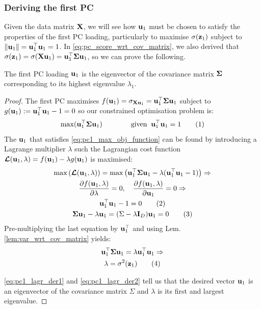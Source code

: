 \documentclass[a4paper]{article}
\begin{document}
\subsubsection{Deriving the first PC}

Given the data matrix $\textbf{X}$, we will see how $\textbf{u}_1$ must be chosen to satisfy the properties of the first PC loading, particularly to maximise $\sigma(\textbf{z}_1)$ subject to $\left\lVert\textbf{u}_1\right\rVert=\textbf{u}_1^{\top}\textbf{u}_1=1$. In \eqref{eq:pc_score_wrt_cov_matrix}, we also derived that $\sigma(\textbf{z}_1) = \sigma(\textbf{X}\textbf{u}_1) = \textbf{u}_1^{\top}\boldsymbol{\Sigma}\textbf{u}_1$, so we can prove the following.

\begin{corollary}[1st PC loading] 
The first PC loading $\textbf{u}_1$ is the eigenvector of the covariance matrix $\boldsymbol{\Sigma}$ corresponding to its highest eigenvalue $\lambda_1$.
\label{cor:first_loading_eigenvec}
\end{corollary}
\begin{proof}
The first PC maximises $f(\textbf{u}_1)=\sigma_{\textbf{X}\textbf{u}_1} = \textbf{u}_1^{\top}\boldsymbol{\Sigma}\textbf{u}_1$ subject to $g(\textbf{u}_1) := \textbf{u}_1^{\top}\textbf{u}_1 - 1 = 0$ so our constrained optimisation problem is:
\[
\max(\textbf{u}_1^{\top}\boldsymbol{\Sigma}\textbf{u}_1) \quad \quad \quad \quad \textup{given} \;\; \textbf{u}_1^{\top}\textbf{u}_1=1
\tag{1}
\label{eq:pc1_max_obj_function}
\]
The $\textbf{u}_1$ that satisfies \eqref{eq:pc1_max_obj_function} can be found by introducing a Lagrange multiplier $\lambda$ such the Lagrangian cost function $\boldsymbol{\mathcal{L}}(\textbf{u}_1,\lambda) = f(\textbf{u}_1) - \lambda g(\textbf{u}_1)$ is maximised:
\begin{gather*}
\max\left(\boldsymbol{\mathcal{L}}(\textbf{u}_1,\lambda)\right) = \max\left(\textbf{u}_1^{\top}\boldsymbol{\Sigma}\textbf{u}_1 - \lambda(\textbf{u}_1^{\top}\textbf{u}_1 - 1)\right) \Rightarrow\\
\frac{\partial f(\textbf{u}_1,\lambda)}{\partial \lambda} = 0 , \quad \frac{\partial f(\textbf{u}_1,\lambda)}{\partial \textbf{u}_1} = 0 \Rightarrow \\
\textbf{u}_1^{\top}\textbf{u}_1 - 1 = 0  \label{eq:pc1_lagr_der1} \tag{2}  \\
\boldsymbol{\Sigma}\textbf{u}_1 - \lambda\textbf{u}_1 = (\Sigma - \lambda \textbf{I}_D)\textbf{u}_1 = 0  \label{eq:pc1_lagr_der2} \tag{3} 
\end{gather*}
Pre-multiplying the last equation by $\textbf{u}_1^{\top}$ and using Lem. \ref{lem:var_wrt_cov_matrix} yields:
\begin{gather*}
  \textbf{u}_1^{\top}\boldsymbol{\Sigma}\textbf{u}_1 = \lambda\textbf{u}_1^{\top}\textbf{u}_1 \Rightarrow\\
  \lambda = \sigma^2(\textbf{z}_1) \tag{4}
\end{gather*}

\eqref{eq:pc1_lagr_der1} and \eqref{eq:pc1_lagr_der2} tell us that the desired vector $\textbf{u}_1$ is an eigenvector of the covariance matrix $\Sigma$ and $\lambda$ is its first and largest eigenvalue.
\end{proof}
\end{document}
